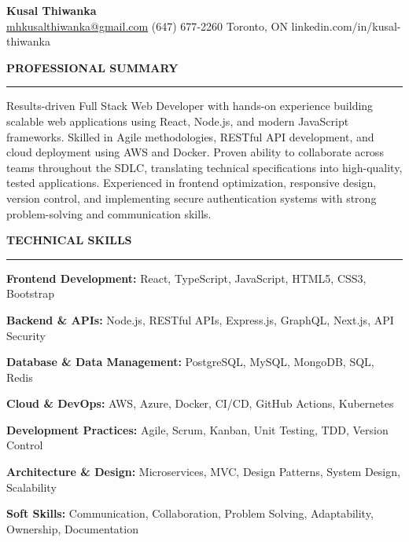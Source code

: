 \documentclass[10pt,letterpaper]{article}
\begin{document}
\begin{center}
{\LARGE\textbf{Kusal Thiwanka}}\\[3pt]
\href{mailto:mhkusalthiwanka@gmail.com}{mhkusalthiwanka@gmail.com}\hspace{2em}%
(647) 677{-}2260\hspace{2em}%
Toronto, ON\hspace{2em}
linkedin.com/in/kusal-thiwanka
\end{center}

\vspace{6pt}

\textbf{PROFESSIONAL SUMMARY}\\[-8pt]
\noindent\rule{\textwidth}{1pt}

\vspace{-2pt}

Results-driven Full Stack Web Developer with hands-on experience building scalable web applications using React, Node.js, and modern JavaScript frameworks. Skilled in Agile methodologies, RESTful API development, and cloud deployment using AWS and Docker. Proven ability to collaborate across teams throughout the SDLC, translating technical specifications into high-quality, tested applications. Experienced in frontend optimization, responsive design, version control, and implementing secure authentication systems with strong problem-solving and communication skills.

\vspace{8pt}

\textbf{TECHNICAL SKILLS}\\[-8pt]
\noindent\rule{\textwidth}{1pt}

\vspace{-2pt}

\textbf{Frontend Development:} React, TypeScript, JavaScript, HTML5, CSS3, Bootstrap

\textbf{Backend \& APIs:} Node.js, RESTful APIs, Express.js, GraphQL, Next.js, API Security

\textbf{Database \& Data Management:} PostgreSQL, MySQL, MongoDB, SQL, Redis

\textbf{Cloud \& DevOps:} AWS, Azure, Docker, CI/CD, GitHub Actions, Kubernetes

\textbf{Development Practices:} Agile, Scrum, Kanban, Unit Testing, TDD, Version Control

\textbf{Architecture \& Design:} Microservices, MVC, Design Patterns, System Design, Scalability

\textbf{Soft Skills:} Communication, Collaboration, Problem Solving, Adaptability, Ownership, Documentation
\end{document}
